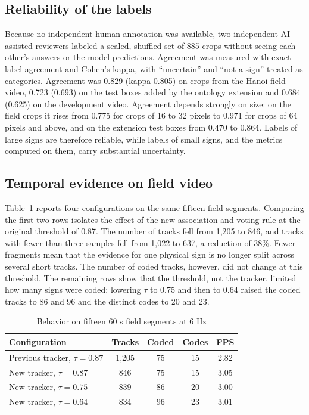 \documentclass[conference,a4paper]{IEEEtran}
\begin{document}
\subsection{Reliability of the labels}

Because no independent human annotation was available, two independent AI-assisted reviewers labeled a sealed, shuffled set of 885 crops without seeing each other's answers or the model predictions. Agreement was measured with exact label agreement and Cohen's kappa, with ``uncertain'' and ``not a sign'' treated as categories. Agreement was 0.829 (kappa 0.805) on crops from the Hanoi field video, 0.723 (0.693) on the test boxes added by the ontology extension and 0.684 (0.625) on the development video. Agreement depends strongly on size: on the field crops it rises from 0.775 for crops of 16 to 32 pixels to 0.971 for crops of 64 pixels and above, and on the extension test boxes from 0.470 to 0.864. Labels of large signs are therefore reliable, while labels of small signs, and the metrics computed on them, carry substantial uncertainty.

\subsection{Temporal evidence on field video}

Table~\ref{tab:field} reports four configurations on the same fifteen field segments. Comparing the first two rows isolates the effect of the new association and voting rule at the original threshold of 0.87. The number of tracks fell from 1,205 to 846, and tracks with fewer than three samples fell from 1,022 to 637, a reduction of 38\%. Fewer fragments mean that the evidence for one physical sign is no longer split across several short tracks. The number of coded tracks, however, did not change at this threshold. The remaining rows show that the threshold, not the tracker, limited how many signs were coded: lowering $\tau$ to 0.75 and then to 0.64 raised the coded tracks to 86 and 96 and the distinct codes to 20 and 23.

\begin{table}[t]
\centering
\caption{Behavior on fifteen 60 s field segments at 6 Hz}
\label{tab:field}
\begin{tabular}{lcccc}
\toprule
Configuration & Tracks & Coded & Codes & FPS \\
\midrule
Previous tracker, $\tau=0.87$ & 1,205 & 75 & 15 & 2.82 \\
New tracker, $\tau=0.87$ & 846 & 75 & 15 & 3.05 \\
New tracker, $\tau=0.75$ & 839 & 86 & 20 & 3.00 \\
New tracker, $\tau=0.64$ & 834 & 96 & 23 & 3.01 \\
\bottomrule
\end{tabular}
\end{table}
\end{document}
